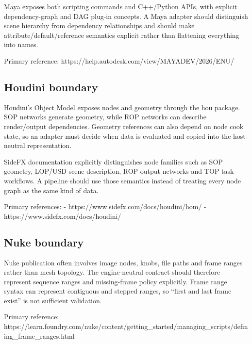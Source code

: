 \hypertarget{appendix-03ade9e1875f-maya-boundary}{}

Maya exposes both scripting commands and C++/Python APIs, with explicit dependency-graph and DAG plug-in concepts. A Maya adapter should distinguish scene hierarchy from dependency relationships and should make attribute/default/reference semantics explicit rather than flattening everything into names.

Primary reference: https://help.autodesk.com/view/MAYADEV/2026/ENU/

\subsection{Houdini boundary}\label{appendix-03ade9e1875f-houdini-boundary}

\hypertarget{appendix-03ade9e1875f-houdini-boundary}{}

Houdini's Object Model exposes nodes and geometry through the hou package. SOP networks generate geometry, while ROP networks can describe render/output dependencies. Geometry references can also depend on node cook state, so an adapter must decide when data is evaluated and copied into the host-neutral representation.

SideFX documentation explicitly distinguishes node families such as SOP geometry, LOP/USD scene description, ROP output networks and TOP task workflows. A pipeline should use those semantics instead of treating every node graph as the same kind of data.

Primary references: - https://www.sidefx.com/docs/houdini/hom/ - https://www.sidefx.com/docs/houdini/

\subsection{Nuke boundary}\label{appendix-03ade9e1875f-nuke-boundary}

\hypertarget{appendix-03ade9e1875f-nuke-boundary}{}

Nuke publication often involves image nodes, knobs, file paths and frame ranges rather than mesh topology. The engine-neutral contract should therefore represent sequence ranges and missing-frame policy explicitly. Frame range syntax can represent contiguous and stepped ranges, so ``first and last frame exist'' is not sufficient validation.

Primary reference: https://learn.foundry.com/nuke/content/getting\_started/managing\_scripts/defining\_frame\_ranges.html

